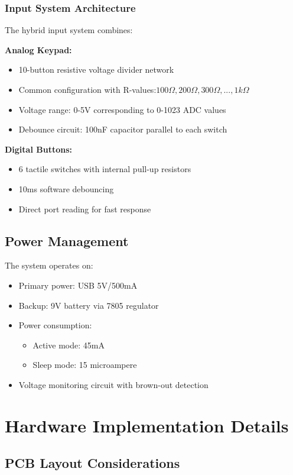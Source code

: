 \documentclass{article}
\begin{document}
\subsubsection{Input System Architecture}
The hybrid input system combines:

\textbf{Analog Keypad:}
\begin{itemize}
\item 10-button resistive voltage divider network
\item Common configuration with R-values:$ 100\Omega, 200\Omega, 300\Omega,...,1k\Omega$
\item Voltage range: 0-5V corresponding to 0-1023 ADC values
\item Debounce circuit: 100nF capacitor parallel to each switch
\end{itemize}

\textbf{Digital Buttons:}
\begin{itemize}
\item 6 tactile switches with internal pull-up resistors
\item 10ms software debouncing
\item Direct port reading for fast response
\end{itemize}



\subsection{Power Management}
The system operates on:
\begin{itemize}
\item Primary power: USB 5V/500mA
\item Backup: 9V battery via 7805 regulator
\item Power consumption:
  \begin{itemize}
  \item Active mode: 45mA
  \item Sleep mode: 15 microampere
  \end{itemize}
\item Voltage monitoring circuit with brown-out detection
\end{itemize}

\section{Hardware Implementation Details}
\subsection{PCB Layout Considerations}
\end{document}
